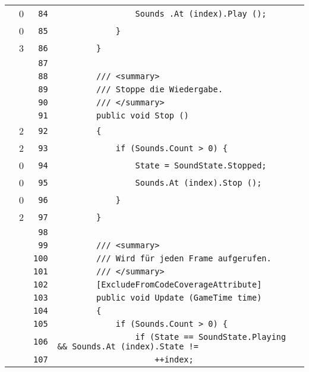 \documentclass[a4paper,10pt]{article}
\begin{document}
\begin{longtable}[l]{lrrl}
\cellcolor{red} & 0 & \verb~84~ & \verb~                Sounds .At (index).Play ();~\\
\cellcolor{red} & 0 & \verb~85~ & \verb~            }~\\
\cellcolor{green} & 3 & \verb~86~ & \verb~        }~\\
\cellcolor{gray} &  & \verb~87~ & \verb~~\\
\cellcolor{gray} &  & \verb~88~ & \verb~        /// <summary>~\\
\cellcolor{gray} &  & \verb~89~ & \verb~        /// Stoppe die Wiedergabe.~\\
\cellcolor{gray} &  & \verb~90~ & \verb~        /// </summary>~\\
\cellcolor{gray} &  & \verb~91~ & \verb~        public void Stop ()~\\
\cellcolor{green} & 2 & \verb~92~ & \verb~        {~\\
\cellcolor{green} & 2 & \verb~93~ & \verb~            if (Sounds.Count > 0) {~\\
\cellcolor{red} & 0 & \verb~94~ & \verb~                State = SoundState.Stopped;~\\
\cellcolor{red} & 0 & \verb~95~ & \verb~                Sounds.At (index).Stop ();~\\
\cellcolor{red} & 0 & \verb~96~ & \verb~            }~\\
\cellcolor{green} & 2 & \verb~97~ & \verb~        }~\\
\cellcolor{gray} &  & \verb~98~ & \verb~~\\
\cellcolor{gray} &  & \verb~99~ & \verb~        /// <summary>~\\
\cellcolor{gray} &  & \verb~100~ & \verb~        /// Wird für jeden Frame aufgerufen.~\\
\cellcolor{gray} &  & \verb~101~ & \verb~        /// </summary>~\\
\cellcolor{gray} &  & \verb~102~ & \verb~        [ExcludeFromCodeCoverageAttribute]~\\
\cellcolor{gray} &  & \verb~103~ & \verb~        public void Update (GameTime time)~\\
\cellcolor{gray} &  & \verb~104~ & \verb~        {~\\
\cellcolor{gray} &  & \verb~105~ & \verb~            if (Sounds.Count > 0) {~\\
\cellcolor{gray} &  & \verb~106~ & \verb~                if (State == SoundState.Playing && Sounds.At (index).State != ~\\
\cellcolor{gray} &  & \verb~107~ & \verb~                    ++index;~\\

\end{longtable}
\end{document}
